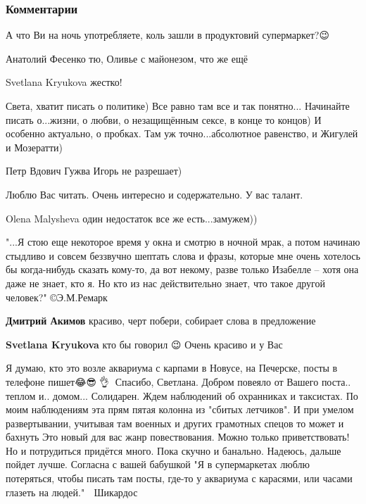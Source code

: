  
 
 
 
 
\subsubsection{Комментарии}

\begin{itemize}
А что Ви на ночь употребляете, коль зашли в продуктовий супермаркет?😉


Анатолий Фесенко тю, Оливье с майонезом, что же ещё

Svetlana Kryukova жестко!

Света, хватит писать о политике) Все равно там все и так понятно...
Начинайте писать о...жизни, о любви, о незащищённым сексе, в конце то концов) И особенно актуально, о пробках. Там уж точно...абсолютное равенство, и Жигулей и Мозератти)🙂

Петр Вдович Гужва Игорь не разрешает)

Люблю Вас читать. Очень интересно и содержательно. У вас талант.

Olena Malysheva один недостаток все же есть...замужем))

"...Я стою еще некоторое время у окна и смотрю в ночной мрак, а потом начинаю стыдливо и совсем беззвучно шептать слова и фразы, которые мне очень хотелось бы когда-нибудь сказать кому-то, да вот некому, разве только Изабелле – хотя она даже не знает, кто я. Но кто из нас действительно знает, что такое другой человек?" ©Э.М.Ремарк

\textbf{Дмитрий Акимов} красиво, черт побери, собирает слова в предложение

\textbf{Svetlana Kryukova} кто бы говорил 😉 Очень красиво и у Вас

Я думаю, кто это возле аквариума с карпами в Новусе, на Печерске, посты в телефоне пишет😂😎🤘👌🔝
Спасибо, Светлана. Добром повеяло от Вашего поста.. теплом и.. домом...
Солидарен. Ждем наблюдений об охранниках и таксистах. По моим наблюдениям эта прям пятая колонна из "сбитых летчиков". И при умелом развертывании, учитывая там военных и других грамотных спецов то может и бахнуть
Это новый для вас жанр повествования. Можно только приветствовать! Но и потрудиться придётся много. Пока скучно и банально. Надеюсь, дальше пойдет лучше.
Согласна с вашей бабушкой
"Я в супермаркетах люблю потеряться, чтобы писать там посты, где-то у аквариума с карасями, или часами глазеть на людей." 🤦
Шикардос


\end{itemize}
